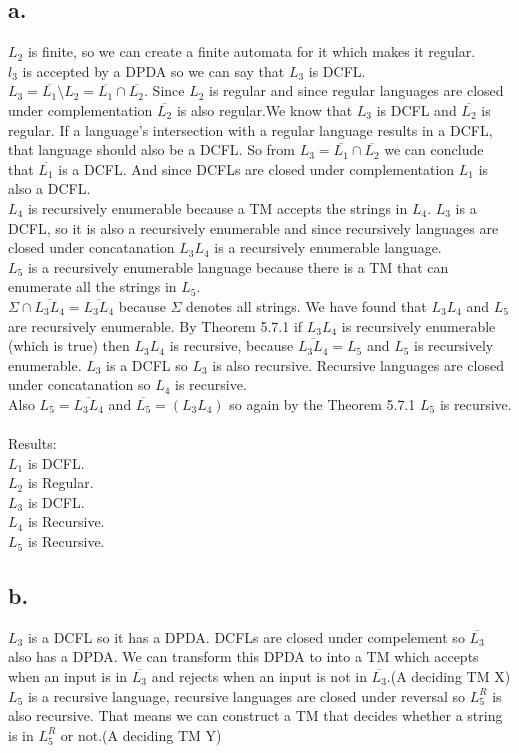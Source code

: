 \documentclass[12pt]{article}
\begin{document}
{{\subsection*{a.}
$L_2$ is finite, so we can create a finite automata for it which makes it regular.\\
$l_3$ is accepted by a DPDA so we can say that $L_3$ is DCFL.\\
$L_3 =\overline{L_1} \setminus L_2 =\overline{L_1} \cap \overline{L_2}$. Since $L_2$ is regular and since regular languages are closed under complementation $\overline{L_2}$ is also regular.We 
know that $L_3$ is DCFL and $\overline{L_2}$ is regular. If a language's intersection with a regular language results in a DCFL, that language should also be a DCFL. So from $L_3=\overline{L_1}
\cap \overline{L_2}$ we can conclude that $\overline{L_1}$ is a DCFL. And since DCFLs are closed under complementation $L_1$ is also a DCFL.\\
$L_4$ is recursively enumerable because a TM accepts the strings in $L_4$. $L_3$ is a DCFL, so it is also a recursively enumerable and since recursively languages are closed under concatanation
$L_3 L_4$ is a recursively enumerable language.\\
$L_5$ is a recursively enumerable language because there is a TM that can enumerate all the strings in $L_5$.\\
$\Sigma \cap \overline{L_3 L_4} = \overline{L_3 L_4}$ because $\Sigma $ denotes all strings. We have found that $L_3 L_4$ and $L_5$ are recursively enumerable. By Theorem 5.7.1 if $L_3 L_4$ is
recursively enumerable (which is true) then $L_3 L_4$ is recursive, because $\overline{L_3 L_4}=L_5$ and $L_5$ is recursively enumerable. $L_3$ is a DCFL so $L_3$ is also recursive. Recursive
languages are closed under concatanation so $L_4$ is recursive.\\

Also $L_5=\overline{L_3 L_4}$ and $\overline{L_5}=(L_3 L_4)$ so again by the Theorem 5.7.1 $L_5$ is recursive.\\
\\
Results:\\
$L_1$ is DCFL.\\
$L_2$ is Regular.\\
$L_3$ is DCFL.\\
$L_4$ is Recursive.\\
$L_5$ is Recursive.
 
\subsection*{b.}
$L_3$ is a DCFL so it has a DPDA. DCFLs are closed under compelement so $\overline{L_3}$ also has a DPDA. We can transform this DPDA to into a TM which accepts when an input is in $\overline{L_3}$ and rejects when an input is not in $\overline{L_3}$.(A deciding TM X)\\
$L_5$ is a recursive language, recursive languages are closed under reversal so $L_5^R$ is also recursive. That means we can construct a TM that decides whether a string is in $L_5^R$ or not.(A deciding TM Y)\\

}}
\end{document}
